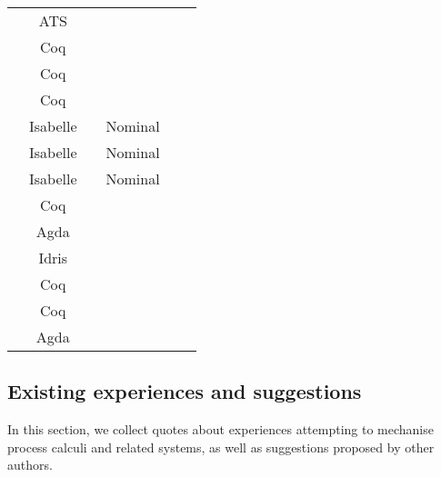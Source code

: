 \begin{center}
\begin{tabular}{l|c|c|c|c|l}
  \cite{Xi2016}                      & ATS                    &           &         &             &             \\
  \cite{Hirsch2022}                  & Coq                    &           &         &             &             \\
  \cite{Cruz-Filipe2021b}            & Coq                    &           &         &             &             \\
  \cite{Maksimovic2015}              & Coq                    &           &         &             &             \\
  \cite{Parrow2014}                  & Isabelle               &           & Nominal &             &             \\
  \cite{Bengtson2016}                & Isabelle               &           & Nominal &             &             \\
  \cite{Kahsai2008}                  & Isabelle               &           & Nominal &             &             \\
  \cite{Castro-Perez2021}            & Coq                    &           &         &             &             \\
  \cite{Gay2020}                     & Agda                   &           &         &             &             \\
  \cite{Brady2017}                   & Idris                  &           &         &             &             \\
  \cite{Hinrichsen2019}              & Coq                    &           &         &             &             \\
  \cite{Sergey2017}                  & Coq                    &           &         &             &             \\
  \cite{DBLP:conf/forte/ZalakainD21} & Agda                   &           &         &             & 
\end{tabular}
\end{center}

\subsection{Existing experiences and suggestions}
In this section, we collect quotes about experiences attempting to mechanise process calculi and related systems, as well as suggestions proposed by other authors.

